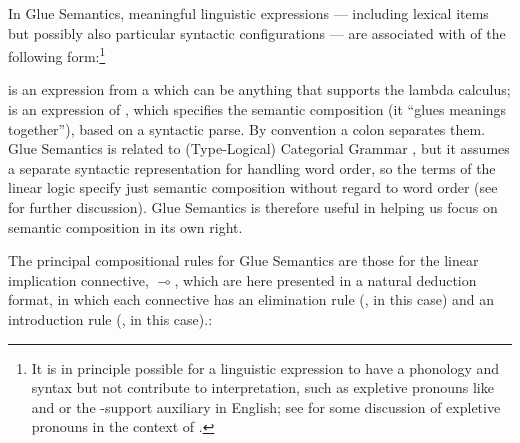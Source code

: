 In Glue Semantics, meaningful
linguistic expressions --- including lexical items but possibly also
particular syntactic configurations --- are associated
with  of the following form:\footnote{It is
in principle possible for a linguistic expression to have a phonology
and syntax but not contribute to interpretation, such as expletive
pronouns like  and  or the -support
auxiliary in English; see \citet[113]{asudeh-lpr} for some discussion of
expletive pronouns in the context of \glue.}
\begin{exe}
\ex {}
\end{exe}
%
 is an expression from a 
which can be anything that supports the lambda calculus;  is an
expression of  \citep{girard87}, which 
specifies the semantic composition (it ``glues meanings
together''), based on a syntactic parse.  By convention a colon separates them. Glue Semantics is related to (Type-Logical) Categorial
Grammar \citep{carpenter97,morrill94a,morrill11,moortgat97}, but it
assumes a separate syntactic representation for handling word order,
so the terms of the linear logic specify just semantic
composition without regard to word order 
(see \citealt{asudeh-lpr} for further discussion). Glue Semantics is
therefore useful in helping us focus on semantic composition in its
own right.

The principal compositional rules for Glue Semantics are those for the
linear implication connective, $\multimap$, which are here presented in a
natural deduction format, in which each connective has an elimination rule (\formula{\linimpE}, in this case) and an introduction rule (\formula{\linimpI}, in this case).:
%
%  
%
  
